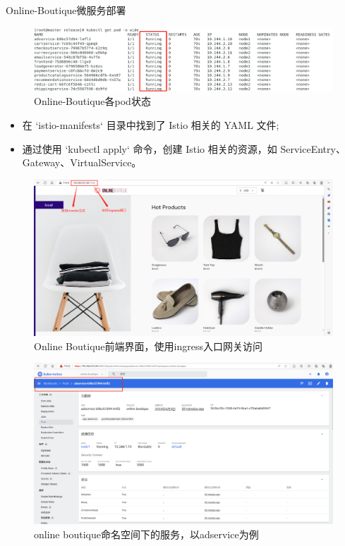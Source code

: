 \documentclass{beamer}
\begin{document}
\begin{frame}{Online-Boutique微服务部署}
\begin{figure}[H]
	\centering
	\includegraphics[width=1.0\textwidth]{pic/nodes.png}
	\caption{Online-Boutique各pod状态}
\end{figure}
\begin{itemize}
	\item 在 `istio-manifests` 目录中找到了 Istio 相关的 YAML 文件;
	\item 通过使用 `kubectl apply` 命令，创建 Istio 相关的资源，如 ServiceEntry、Gateway、VirtualService。
\end{itemize}
\end{frame}
\begin{frame}
	\begin{figure}[H]
		\centering
		\includegraphics[width=1.0\textwidth]{pic/Online Boutique.png}
		\caption{Online Boutique前端界面，使用ingress入口网关访问}
	\end{figure}
\end{frame}
\begin{frame}
	\begin{figure}[H]
		\centering
		\includegraphics[width=1.0\textwidth]{pic/online boutique on dashboard.png}
		\caption{online boutique命名空间下的服务，以adservice为例}
	\end{figure}
\end{frame}
\end{document}
